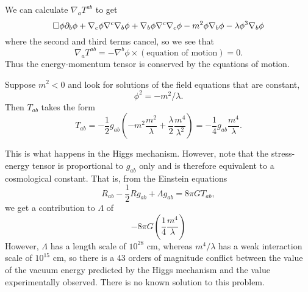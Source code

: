 We can calculate $\nabla_a T^{ab}$ to get%
\begin{equation*}
   \Box \phi \partial_b \phi + \nabla_c \phi \nabla^c \nabla_b \phi + \nabla_b \phi \nabla^c \nabla_c \phi - m^2 \phi \nabla_b \phi - \lambda \phi^3 \nabla_b \phi 
\end{equation*}
where the second and third terms cancel,%
so we see that
$$\nabla_a T^{ab}=-\nabla^b \phi \times (\text{equation of motion})=0.$$
Thus the energy-momentum tensor is conserved by the equations of motion.

Suppose $m^2 <0$ and look for solutions of the field equations that are constant,
$$\phi^2 = -m^2/\lambda.$$ Then $T_{ab}$ takes the form
$$T_{ab}=-\frac{1}{2}g_{ab}(-m^2 \frac{m^2}{\lambda}+\frac{\lambda}{2} \frac{m^4}{\lambda^2})= -\frac{1}{4}g_{ab} \frac{m^4}{\lambda}.$$

This is what happens in the Higgs mechanism. %
However, note that the stress-energy tensor is proportional to $g_{ab}$ only and is therefore equivalent to a cosmological constant. That is, from the Einstein equations
$$R_{ab}-\frac{1}{2}R g_{ab} +\Lambda g_{ab} = 8\pi G T_{ab},$$ 
we get a contribution to $\Lambda$ of
$$-8\pi G \left(\frac{1}{4} \frac{m^4}{\lambda}\right)$$ However, $\Lambda$ has a length scale of $10^{28}$ cm, whereas $m^4/\lambda$ has a weak interaction scale of $10^{15}$ cm, so there is a 43 orders of magnitude conflict between the value of the vacuum energy predicted by the Higgs mechanism and the value experimentally observed. There is no known solution to this problem.

